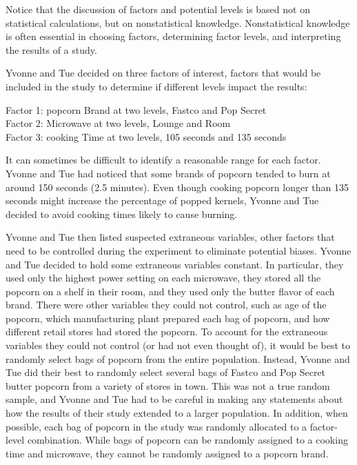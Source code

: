 \documentclass[
]{report}
\begin{document}
Notice that the discussion of factors and potential levels is based not on statistical calculations, but on nonstatistical knowledge. Nonstatistical knowledge is often essential in choosing factors, determining factor levels, and interpreting the results of a study.

Yvonne and Tue decided on three factors of interest, factors that would be included in the study to determine if different levels impact the results:

Factor 1: popcorn Brand at two levels, Fastco and Pop Secret\\
Factor 2: Microwave at two levels, Lounge and Room\\
Factor 3: cooking Time at two levels, 105 seconds and 135 seconds

It can sometimes be difficult to identify a reasonable range for each factor. Yvonne and Tue had noticed that some brands of popcorn tended to burn at around 150 seconds (2.5 minutes). Even though cooking popcorn longer than 135 seconds might increase the percentage of popped kernels, Yvonne and Tue decided to avoid cooking times likely to cause burning.

Yvonne and Tue then listed suspected extraneous variables, other factors that need to be controlled during the experiment to eliminate potential biases. Yvonne and Tue decided to hold some extraneous variables constant. In particular, they used only the highest power setting on each microwave, they stored all the popcorn on a shelf in their room, and they used only the butter flavor of each brand. There were other variables they could not control, such as age of the popcorn, which manufacturing plant prepared each bag of popcorn, and how different retail stores had stored the popcorn. To account for the extraneous variables they could not control (or had not even thought of), it would be best to randomly select bags of popcorn from the entire population. Instead, Yvonne and Tue did their best to randomly select several bags of Fastco and Pop Secret butter popcorn from a variety of stores in town. This was not a true random sample, and Yvonne and Tue had to be careful in making any statements about how the results of their study extended to a larger population. In addition, when possible, each bag of popcorn in the study was randomly allocated to a factor-level combination. While bags of popcorn can be randomly assigned to a cooking time and microwave, they cannot be randomly assigned to a popcorn brand.

\large
\end{document}
